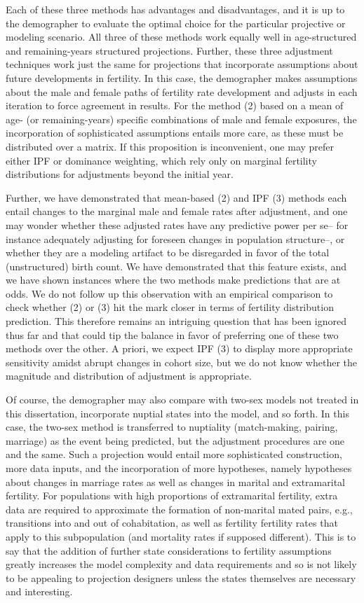 Each of these three methods has advantages and disadvantages, and it is up to
the demographer to evaluate the optimal choice for the particular projective or
modeling scenario. All three of these methods work equally well in
age-structured and remaining-years structured projections. Further, these three
adjustment techniques work just the same for projections that incorporate
assumptions about future developments in fertility. In this case, the
demographer makes assumptions about the male and female paths of fertility 
rate development and adjusts in each
iteration to force agreement in results. For the method (2) based on a mean of
age- (or remaining-years) specific combinations of male and female exposures,
the incorporation of sophisticated assumptions entails more care, as these must be
distributed over a matrix. If this proposition is inconvenient, one may prefer
either IPF or dominance weighting, which rely only on marginal fertility
distributions for adjustments beyond the initial year.

Further, we have demonstrated that mean-based (2) and IPF (3) methods each
entail changes to the marginal male and female rates after adjustment, and one
may wonder whether these adjusted rates have any predictive power per se-- for
instance adequately adjusting for foreseen changes in population structure--, or
whether they are a modeling artifact to be disregarded in favor of the total 
(unstructured) birth count. We have demonstrated that this feature exists,
and we have shown instances where the two methods make predictions that are at
odds. We do not follow up this observation with an empirical comparison
to check whether (2) or (3) hit the mark closer in terms of
fertility distribution prediction. This therefore remains an intriguing question
that has been ignored thus far and that could tip the balance in favor of
preferring one of these two methods over the other. A priori, we expect IPF (3) 
to display more appropriate sensitivity amidst abrupt
changes in cohort size, but we do not know whether the magnitude and
distribution of adjustment is appropriate. 

Of course, the demographer may also compare with two-sex models not treated
in this dissertation, incorporate nuptial states into the model, and so
forth. In this case, the two-sex method is transferred to nuptiality
(match-making, pairing, marriage) as the event being predicted, but the
adjustment procedures are one and the same. Such a projection would
entail more sophisticated construction, more data inputs, and the incorporation of more hypotheses,
namely hypotheses about changes in marriage rates as well as changes in marital
and extramarital fertility. For populations with high proportions of
extramarital fertility, extra data are required to approximate the formation of
non-marital mated pairs, e.g., transitions into and out of cohabitation, as well
as fertility fertility rates that apply to this subpopulation (and mortality
rates if supposed different). This is to say that the addition of further state
considerations to fertility assumptions greatly increases the model complexity
and data requirements and so is not likely to be appealing to projection
designers unless the states themselves are necessary and interesting.

